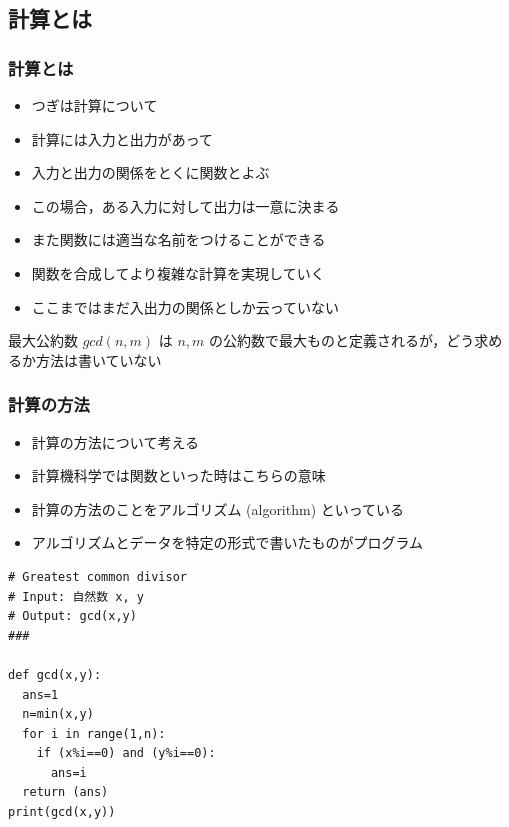\subsection{計算とは}
\begin{frame}
\frametitle{計算とは}
  \begin{itemize}
\item つぎは計算について
\item 計算には入力と出力があって
\item 入力と出力の関係をとくに関数とよぶ
\item この場合，ある入力に対して出力は一意に決まる
\item また関数には適当な名前をつけることができる
\item 関数を合成してより複雑な計算を実現していく
\item ここまではまだ入出力の関係としか云っていない
  \end{itemize}
  \begin{example}[最大公約数]
最大公約数 \(gcd(n,m)\) は \(n, m\) の公約数で最大ものと定義されるが，どう求めるか方法は書いていない
  \end{example}
\end{frame}
\begin{frame}
\frametitle{計算の方法}
  \begin{itemize}
\item 計算の方法について考える
\item 計算機科学では関数といった時はこちらの意味
\item 計算の方法のことをアルゴリズム (algorithm) といっている
\item アルゴリズムとデータを特定の形式で書いたものがプログラム
  \end{itemize}
  \begin{lstlisting}[caption={最大公約数},label=gcd]
# Greatest common divisor
# Input: 自然数 x, y
# Output: gcd(x,y)
###

def gcd(x,y):
  ans=1
  n=min(x,y)
  for i in range(1,n):
    if (x%i==0) and (y%i==0):
      ans=i
  return (ans)
print(gcd(x,y))
  \end{lstlisting}
\hfill{\hyperlink{if}{}}
\end{frame}
